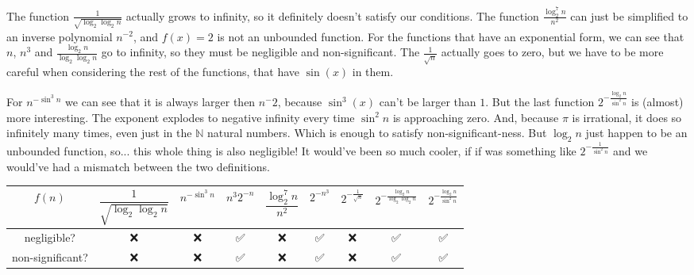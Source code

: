 \documentclass{article}
\begin{document}
  The function $\frac{1}{\sqrt{\log_2 \log_2 n}}$ actually grows to infinity, so it definitely doesn't satisfy our conditions.
  The function $\frac{\log_2^7 n}{n^2}$ can just be simplified to an inverse polynomial $n^{-2}$, and $f(x) = 2$ is not an unbounded function.
  For the functions that have an exponential form, we can see that $n$, $n^3$ and $\frac{\log_2 n}{\log_2 \log_2 n}$ go to infinity, so they must be negligible and non-significant.
  The $\frac{1}{\sqrt{n}}$ actually goes to zero, but we have to be more careful when considering the rest of the functions, that have $\sin(x)$ in them.

  For $n^{-\sin^3 n}$ we can see that it is always larger then $n^-2$, because $\sin^3(x)$ can't be larger than $1$.
  But the last function $2^{-\frac{\log_2 n}{\sin^2{n}}}$ is (almost) more interesting.
  The exponent explodes to negative infinity every time $\sin^2 n$ is approaching zero.
  And, because $\pi$ is irrational, it does so infinitely many times, even just in the $\mathbb{N}$ natural numbers.
  Which is enough to satisfy non-significant-ness.
  But $\log_2 n$ just happen to be an unbounded function, so... this whole thing is also negligible!
  It would've been so much cooler, if if was something like $2^{-\frac{1}{\sin^2 n}}$ and we would've had a mismatch between the two definitions.

  \begin{center}
    \def\arraystretch{1.5}
    \begin{tabular}{c|c|c|c|c|c|c|c|c|}
      $f(n)$ &
      $\dfrac{1}{\sqrt{\log_2 \log_2 n}}$ &
      $n^{-\sin^3 n}$ &
      $n^3 2^{-n}$ &
      $\dfrac{\log_2^7 n}{n^2}$ &
      $2^{-n^3}$ &
      $2^{-\frac{1}{\sqrt{n}}}$ &
      $2^{-\frac{\log_2 n}{\log_2 \log_2 n}}$ &
      $2^{-\frac{\log_2 n}{\sin^2{n}}}$
      \\\hline negligible? &
      ❌ & ❌ & ✅ & ❌ & ✅ & ❌ & ✅ & ✅
      \\\hline non-significant? &
      ❌ & ❌ & ✅ & ❌ & ✅ & ❌ & ✅ & ✅
      \\\hline
    \end{tabular}
  \end{center}
\end{document}
